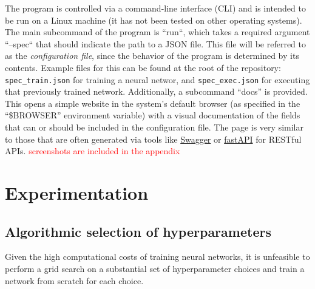 \documentclass[twocolumn,twoside,a4paper,10pt]{IEEEtran}
\newcommand{\Frank}[1]{\textcolor{red}{#1}}
\begin{document}
The program is controlled via a command-line interface (CLI) and is intended to be run on a Linux machine (it has not been tested on other operating systems). The main subcommand of the program is ``run``, which takes a required argument ``--spec`` that should indicate the path to a JSON file. This file will be referred to as the \textit{configuration file}, since the behavior of the program
is determined by its contents. Example files for this can be found at the root of the repository: \verb|spec_train.json| for training a neural networ, and \verb|spec_exec.json| for executing that previously trained network. Additionally, a subcommand ``docs'' is provided. This opens a simple website in
the system's default browser (as specified in the ``\$BROWSER'' environment variable) with a visual documentation of the fields that can or should be included in the configuration file. The page is very similar to those that are
often generated via tools like \href{https://editor.swagger.io/}{Swagger} or \href{https://fastapi.tiangolo.com/}{fastAPI} for RESTful APIs. \Frank{screenshots are included in the appendix}



\section{Experimentation}
\subsection{Algorithmic selection of hyperparameters}
Given the high computational costs of training neural networks, it is unfeasible to perform a grid search on a substantial set of hyperparameter choices and train a network from scratch for each choice.
\end{document}

